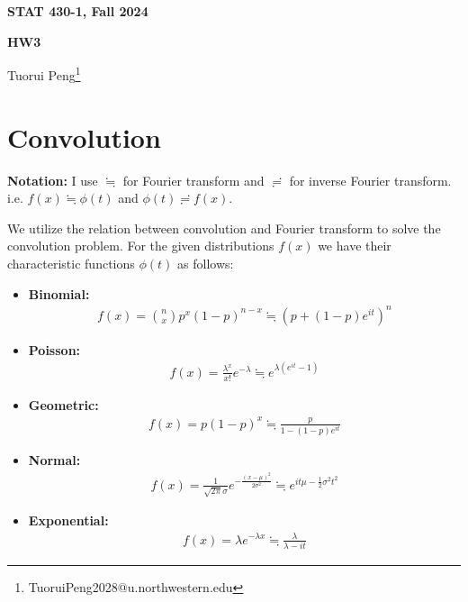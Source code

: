 \documentclass[11pt,a4paper]{article}
\numberwithin{equation}{section}%
\begin{document}
\begin{center}\thispagestyle{plain}

{\LARGE\textbf{STAT 430-1, Fall 2024}}

{\Large\textbf{HW3}}

Tuorui Peng\footnote{TuoruiPeng2028@u.northwestern.edu}
\end{center}

\thispagestyle{myheadings}
\pagestyle{myheadings}

\setcounter{tocdepth}{1}
\tableofcontents

  

\section{Convolution}

\textbf{Notation:} I use $ \fallingdotseq $ for Fourier transform and $ \risingdotseq $ for inverse Fourier transform. i.e. $ f(x)\fallingdotseq \phi (t) $ and $ \phi (t)\risingdotseq f(x) $.

We utilize the relation between convolution and Fourier transform to solve the convolution problem. For the given distributions $ f(x) $ we have their characteristic functions $ \phi (t) $ as follows:
\begin{itemize}[topsep=2pt,itemsep=0pt]
    \item \textbf{Binomial:} 
    \begin{align*}
        f(x)=\binom{n}{x}p^x(1-p)^{n-x} \fallingdotseq (p+(1-p)e^{it})^n
    \end{align*}
    \item \textbf{Poisson:}
    \begin{align*}
        f(x)=\frac{\lambda^x}{x!}e^{-\lambda} \fallingdotseq e^{\lambda(e^{it}-1)} 
    \end{align*}
    \item \textbf{Geometric:}
    \begin{align*}
        f(x)=p(1-p)^x \fallingdotseq \frac{p}{1-(1-p)e^{it}} 
    \end{align*}
    \item \textbf{Normal:}
    \begin{align*}
        f(x)=\frac{1}{\sqrt{2\pi}\sigma}e^{-\frac{(x-\mu)^2}{2\sigma^2}} \fallingdotseq e^{it\mu-\frac{1}{2}\sigma^2t^2} 
    \end{align*}
    \item \textbf{Exponential:}
    \begin{align*}
        f(x)=\lambda e^{-\lambda x} \fallingdotseq \frac{\lambda}{\lambda-it} 
    \end{align*}
\end{itemize}
\end{document}
